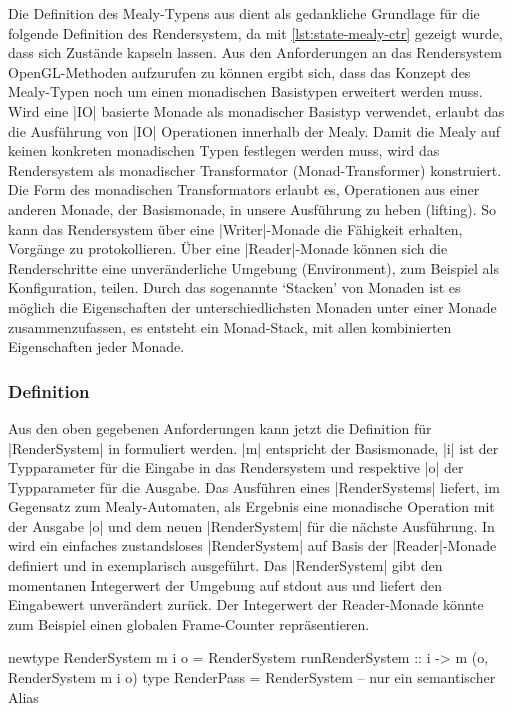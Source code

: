 Die Definition des Mealy-Typens aus  dient als gedankliche Grundlage für die folgende Definition des Rendersystem, da mit \ref{lst:state-mealy-ctr} gezeigt wurde, dass sich Zustände kapseln lassen. Aus den Anforderungen an das Rendersystem OpenGL-Methoden aufzurufen zu können ergibt sich, dass das Konzept des Mealy-Typen noch um einen monadischen Basistypen erweitert werden muss. Wird eine |IO| basierte Monade als monadischer Basistyp verwendet, erlaubt das die Ausführung von |IO| Operationen innerhalb der Mealy. Damit die Mealy auf keinen konkreten monadischen Typen festlegen werden muss, wird das Rendersystem als monadischer Transformator (Monad-Transformer) konstruiert. Die Form des monadischen Transformators erlaubt es, Operationen aus einer anderen Monade, der Basismonade, in unsere Ausführung zu heben (lifting). So kann das Rendersystem über eine |Writer|-Monade die Fähigkeit erhalten, Vorgänge zu protokollieren. Über eine |Reader|-Monade können sich die Renderschritte eine unveränderliche Umgebung (Environment), zum Beispiel als Konfiguration, teilen. Durch das sogenannte `Stacken' von Monaden ist es möglich die Eigenschaften der unterschiedlichsten Monaden unter einer Monade zusammenzufassen, es entsteht ein Monad-Stack, mit allen kombinierten Eigenschaften jeder Monade.

\subsubsection{Definition}

Aus den oben gegebenen Anforderungen kann jetzt die Definition für |RenderSystem| in  formuliert werden. |m| entspricht der Basismonade, |i| ist der Typparameter für die Eingabe in das Rendersystem und respektive |o| der Typparameter für die Ausgabe. Das Ausführen eines |RenderSystems| liefert, im Gegensatz zum Mealy-Automaten, als Ergebnis eine monadische Operation mit der Ausgabe |o| und dem neuen |RenderSystem| für die nächste Ausführung. In  wird ein einfaches zustandsloses |RenderSystem| auf Basis der |Reader|-Monade definiert und in  exemplarisch ausgeführt. Das |RenderSystem| gibt den momentanen Integerwert der Umgebung auf stdout aus und liefert den Eingabewert unverändert zurück. Der Integerwert der Reader-Monade könnte zum Beispiel einen globalen Frame-Counter repräsentieren.

\begin{haskell}[label={lst:definition-rendersystem},caption={Definition Rendersystem}]
newtype RenderSystem m i o = RenderSystem { runRenderSystem :: i -> m (o, RenderSystem m i o) }
type RenderPass = RenderSystem -- nur ein semantischer Alias
\end{haskell}

